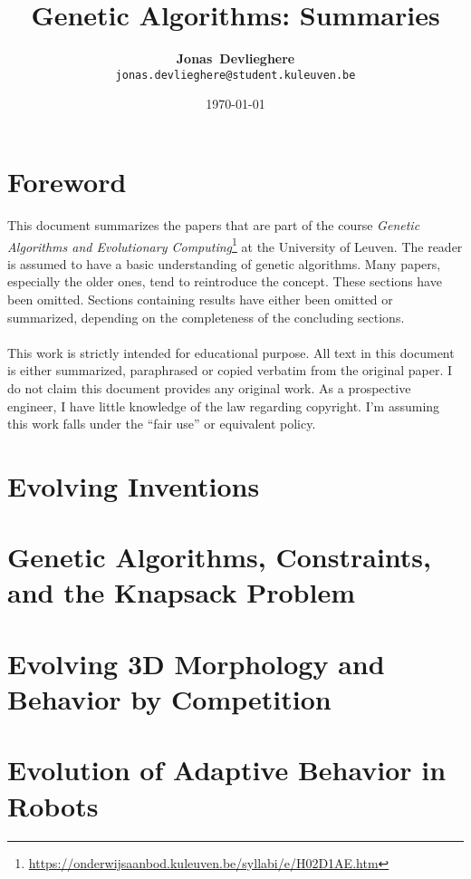 \documentclass[a4paper, 10pt, oneside]{article}
\title{Genetic Algorithms: Summaries}
\date{\today}
\author{\textbf{Jonas~Devlieghere} \\ \texttt{jonas.devlieghere@student.kuleuven.be}}
\theoremstyle{definition}
\begin{document}
\maketitle
\newpage

\tableofcontents
\newpage

\section*{Foreword}

This document summarizes the papers that are part of the course \emph{Genetic Algorithms and Evolutionary
Computing}\footnote{\url{https://onderwijsaanbod.kuleuven.be/syllabi/e/H02D1AE.htm}} at the University of Leuven. The
reader is assumed to have a basic understanding of genetic algorithms. Many papers, especially the older ones, tend to
reintroduce the concept. These sections have been omitted. Sections containing results have either been omitted or summarized, depending on the completeness of the concluding sections.
\\\\
This work is strictly intended for educational purpose. All text in this document is either summarized, paraphrased or
copied verbatim from the original paper. I do not claim this document provides any original work. As a prospective
engineer, I have little knowledge of the law regarding copyright. I'm assuming this work falls under the ``fair use''
or equivalent policy.

\section{Evolving Inventions}


\section{Genetic Algorithms, Constraints, and the Knapsack Problem}


\section{Evolving 3D Morphology and Behavior by Competition}


\section{Evolution of Adaptive Behavior in Robots}

\end{document}
